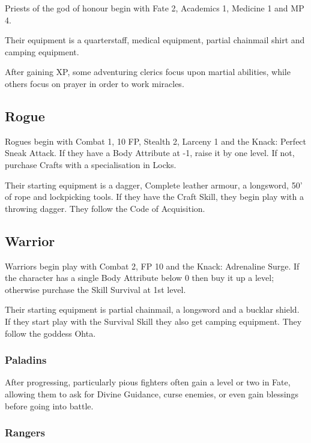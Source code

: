 Priests of the god of honour begin with Fate 2, Academics 1, Medicine 1 and MP 4.

Their equipment is a quarterstaff, medical equipment, partial chainmail shirt and camping equipment.

After gaining XP, some adventuring clerics focus upon martial abilities, while others focus on prayer in order to work miracles.

\subsection{Rogue}

Rogues begin with Combat 1, 10 FP, Stealth 2, Larceny 1 and the Knack: Perfect Sneak Attack.  If they have a Body Attribute at -1, raise it by one level.  If not, purchase Crafts with a specialisation in Locks.

Their starting equipment is a dagger, Complete leather armour, a longsword, 50' of rope and lockpicking tools.  If they have the Craft Skill, they begin play with a throwing dagger.  They follow the Code of Acquisition.

\subsection{Warrior}

Warriors begin play with Combat 2, FP 10 and the Knack: Adrenaline Surge.  If the character has a single Body Attribute below 0 then buy it up a level; otherwise purchase the Skill Survival at 1st level.

Their starting equipment is partial chainmail, a longsword and a bucklar shield.  If they start play with the Survival Skill they also get camping equipment.  They follow the goddess Ohta.

\subsubsection{Paladins}

After progressing, particularly pious fighters often gain a level or two in Fate, allowing them to ask for Divine Guidance, curse enemies, or even gain blessings before going into battle.

\subsubsection{Rangers}

